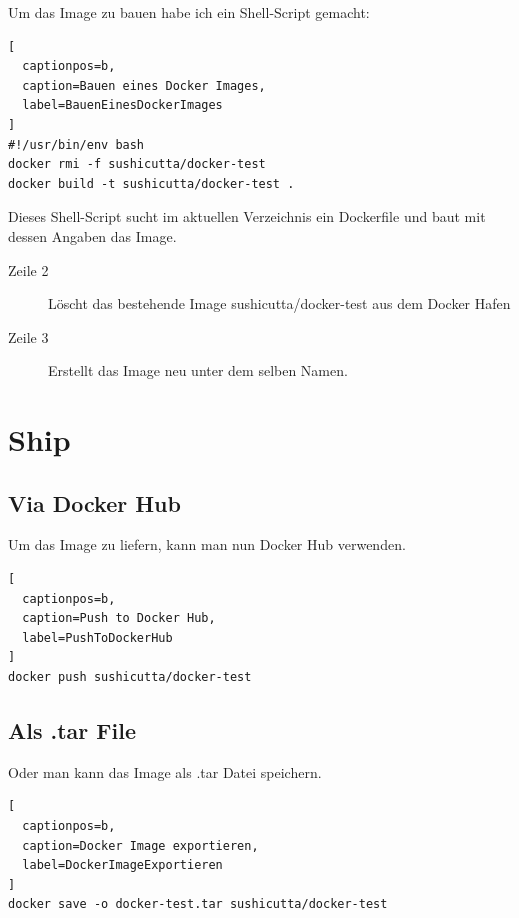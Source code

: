 Um das Image zu bauen habe ich ein Shell-Script gemacht:
\\

\begin{lstlisting}[
  captionpos=b,
  caption=Bauen eines Docker Images,
  label=BauenEinesDockerImages
]
#!/usr/bin/env bash
docker rmi -f sushicutta/docker-test
docker build -t sushicutta/docker-test .
\end{lstlisting}

Dieses Shell-Script sucht im aktuellen Verzeichnis ein Dockerfile und baut mit dessen
Angaben das Image.

\begin{description}

\item[Zeile 2] Löscht das bestehende Image sushicutta/docker-test aus dem Docker Hafen

\item[Zeile 3] Erstellt das Image neu unter dem selben Namen.

\end{description}

\section{Ship}

\subsection{Via Docker Hub}

Um das Image zu liefern, kann man nun Docker Hub verwenden.
\\

\begin{lstlisting}[
  captionpos=b,
  caption=Push to Docker Hub,
  label=PushToDockerHub
]
docker push sushicutta/docker-test
\end{lstlisting}

\subsection{Als .tar File}

Oder man kann das Image als .tar Datei speichern.
\\

\begin{lstlisting}[
  captionpos=b,
  caption=Docker Image exportieren,
  label=DockerImageExportieren
]
docker save -o docker-test.tar sushicutta/docker-test
\end{lstlisting}

